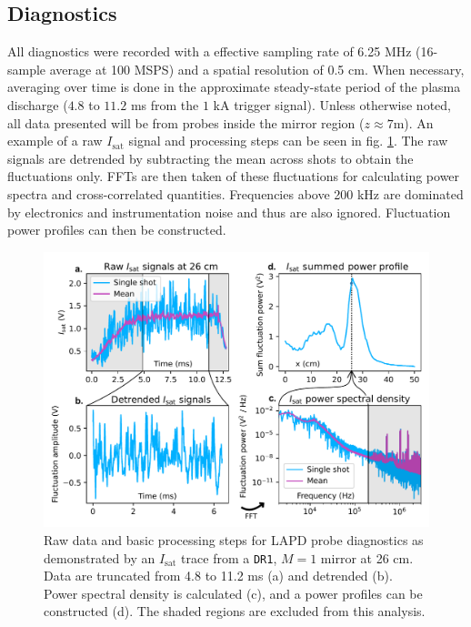 \subsection{\label{sec:sub_diagnostics}Diagnostics}

All diagnostics were recorded with a effective sampling rate of 6.25 MHz (16-sample average at 100 MSPS) and a spatial resolution of 0.5 cm. When necessary, averaging over time is done in the approximate steady-state period of the plasma discharge ($4.8$ to $11.2$ ms from the $1$ kA trigger signal). Unless otherwise noted, all data presented will be from probes inside the mirror region ($z \approx 7$m). An example of a raw $I_\text{sat}$ signal and processing steps can be seen in fig. \ref{fig:raw-signals-plots}. The raw signals are detrended by subtracting the mean across shots to obtain the fluctuations only. FFTs are then taken of these fluctuations for calculating power spectra and cross-correlated quantities. Frequencies above 200 kHz are dominated by electronics and instrumentation noise and thus are also ignored. Fluctuation power profiles can then be constructed.

\begin{figure}
    \centering
    \includegraphics[width=\textwidth]{figures/fig2.pdf}
    \caption{Raw data and basic processing steps for LAPD probe diagnostics as demonstrated by an $I_\text{sat}$ trace from a \texttt{DR1}, $M=1$ mirror at 26 cm. Data are truncated from 4.8 to 11.2 ms (a) and detrended (b). Power spectral density is calculated (c), and a power profiles can be constructed (d). The shaded regions are excluded from this analysis.}
    \label{fig:raw-signals-plots}
\end{figure}

